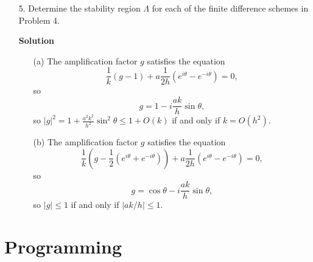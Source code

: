 \documentclass{article}
\providecommand{\abs}[1]{\left\lvert#1\right\rvert}
\begin{document}
\begin{itemize}
\item[5.] Determine the stability region $\Lambda$ for each of the finite difference schemes in Problem 4.

\textbf{Solution}

\begin{itemize}
\item[(a)] The amplification factor $g$ satisfies the equation
\begin{equation*}
\frac{1}{k} \left( g - 1 \right) + a \frac{1}{2h} \left( e^{i\theta} - e^{-i\theta} \right) = 0,
\end{equation*}
so
\begin{equation*}
g = 1 - i \frac{ak}{h} \sin \theta,
\end{equation*}
so $\abs{g}^2 = 1 + \frac{a^2k^2}{h^2} \sin^2 \theta \leq 1 + O(k)$ if and only if $k = O \left( h^2 \right)$.
\item[(b)] The amplification factor $g$ satisfies the equation
\begin{equation*}
\frac{1}{k} \left( g - \frac{1}{2} \left( e^{i\theta} + e^{-i\theta} \right) \right) + a \frac{1}{2h} \left( e^{i\theta} - e^{-i\theta} \right) = 0,
\end{equation*}
so
\begin{equation*}
g = \cos \theta - i \frac{ak}{h} \sin \theta,
\end{equation*}
so $\abs{g} \leq 1$ if and only if $\abs{ak/h} \leq 1$.
\end{itemize}

\end{itemize}

\section{Programming}
\end{document}
